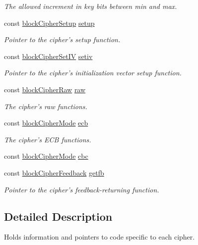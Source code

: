 \begin{CompactItemize}
\begin{CompactList}\small\item\em The allowed increment in key bits between min and max. \item\end{CompactList}\item 
const \hyperlink{group__BC__m_ga0}{block\-Cipher\-Setup} \hyperlink{structblockCipher_o6}{setup}
\begin{CompactList}\small\item\em Pointer to the cipher's setup function. \item\end{CompactList}\item 
const \hyperlink{group__BC__m_ga2}{block\-Cipher\-Set\-IV} \hyperlink{structblockCipher_o7}{setiv}
\begin{CompactList}\small\item\em Pointer to the cipher's initialization vector setup function. \item\end{CompactList}\item 
const \hyperlink{structblockCipherRaw}{block\-Cipher\-Raw} \hyperlink{structblockCipher_o8}{raw}
\begin{CompactList}\small\item\em The cipher's raw functions. \item\end{CompactList}\item 
const \hyperlink{structblockCipherMode}{block\-Cipher\-Mode} \hyperlink{structblockCipher_o9}{ecb}
\begin{CompactList}\small\item\em The cipher's ECB functions. \item\end{CompactList}\item 
const \hyperlink{structblockCipherMode}{block\-Cipher\-Mode} \hyperlink{structblockCipher_o10}{cbc}
\item 
const \hyperlink{beecrypt_8h_a20}{block\-Cipher\-Feedback} \hyperlink{structblockCipher_o11}{getfb}
\begin{CompactList}\small\item\em Pointer to the cipher's feedback-returning function. \item\end{CompactList}\end{CompactItemize}


\subsection{Detailed Description}
Holds information and pointers to code specific to each cipher. 

